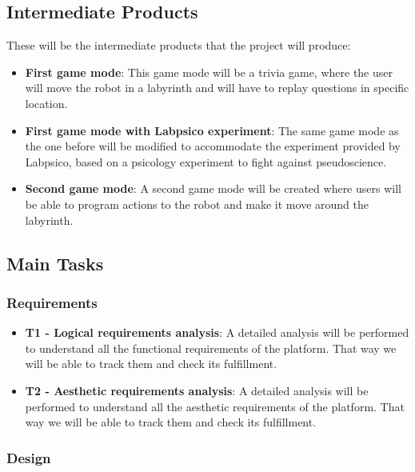 \subsection{Intermediate Products}

These will be the intermediate products that the project will produce:

\begin{itemize}
\item \textbf{First game mode}: This game mode will be a trivia game, where the user will move the
robot in a labyrinth and will have to replay questions in specific location.

\item \textbf{First game mode with Labpsico experiment}: The same game mode as the one before will
be modified to accommodate the experiment provided by Labpsico, based on a psicology experiment
to fight against pseudoscience.

\item \textbf{Second game mode}: A second game mode will be created where users will be able to
program actions to the robot and make it move around the labyrinth.
\end{itemize}

\subsection{Main Tasks}

\subsubsection{Requirements}

\begin{itemize}
\item \textbf{T1 - Logical requirements analysis}: A detailed analysis will be performed to
understand all the functional requirements of the platform. That way we will be able to track them
and check its fulfillment.

\item \textbf{T2 - Aesthetic requirements analysis}: A detailed analysis will be performed to
understand all the aesthetic requirements of the platform. That way we will be able to track them
and check its fulfillment.
\end{itemize}

\subsubsection{Design}


